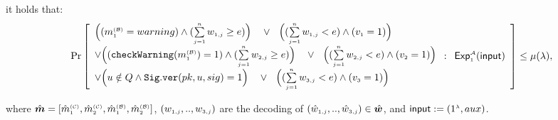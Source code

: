 \begin{definition}
%
\vspace{-2.2mm}
it holds that:
%
$$ \Pr\left[
  \begin{array}{l}
%
%
  \Big((m^{\st\mathcal{(B)}}_{\st1}=warning) \wedge (\sum\limits_{\st j=1}^{\st n}w_{\st 1,j}\geq {e})\Big) \
  \ \ \vee\ \ \Big((\sum\limits_{\st j=1}^{\st n}w_{\st 1,j}<{e}) \wedge ( {v}_{\st 1}=1)\Big)
  \\
\vee
    \Big((\mathtt{checkWarning}(m^{\st\mathcal{(B)}}_{\st1})= 1) \wedge (\sum\limits_{\st j=1}^{\st n}w_{\st 2,j}\geq {e})\Big)\
 \ \ \vee\ \ \Big((\sum\limits_{\st j=1}^{\st n}w_{\st 2,j}< {e}) \wedge ({v}_{\st 2}=1)\Big)
  \\
  \vee 
  \Big(u\notin Q \wedge\mathtt{Sig.ver}( pk,  u, sig) =1\Big) \
  \ \ \vee\ \ \Big((\sum\limits_{\st j=1}^{\st n}w_{\st 3,j}< {e}) \wedge ( {v}_{\st 3}=1)\Big)
  \\
 


  
  





\end{array} :
    \begin{array}{l}
    \mathsf{Exp}_{\st 1}^{\st\mathcal{A}}(\mathsf{input})\\
\end{array}    \right]\leq \mu(\lambda),$$

where  $\hat {\bm m}=[\hat {m}^{\scriptscriptstyle (\mathcal{C})}_{\scriptscriptstyle 1}, \hat {m}^{\scriptscriptstyle (\mathcal{C})}_{\scriptscriptstyle 2}, \hat {m}^{\scriptscriptstyle (\mathcal{B})}_{\scriptscriptstyle 1}, \hat {m}^{\scriptscriptstyle (\mathcal{B})}_{\scriptscriptstyle 2}]$, $(w_{\scriptscriptstyle 1,j},..,w_{\scriptscriptstyle 3,j})$ are the decoding of  $(\hat w_{\scriptscriptstyle 1,j},..,\hat w_{\scriptscriptstyle 3,j})\in \hat {\bm w}$,  and $\mathsf{input}:=(1^{\scriptscriptstyle\lambda}, {aux})$.


\end{definition}


